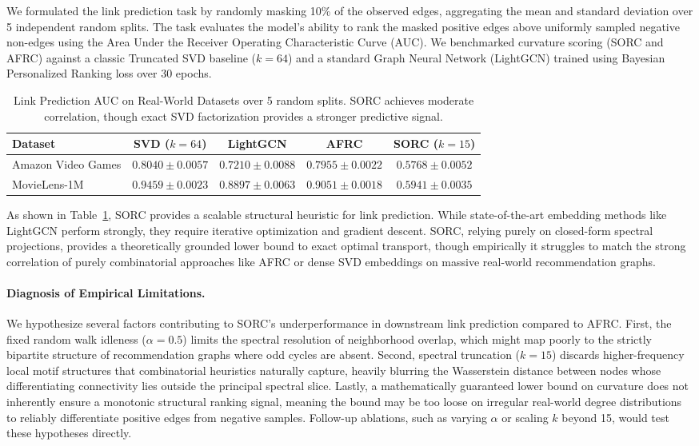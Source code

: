 \documentclass{article}
\begin{document}
We formulated the link prediction task by randomly masking 10\% of the observed edges, aggregating the mean and standard deviation over 5 independent random splits. The task evaluates the model's ability to rank the masked positive edges above uniformly sampled negative non-edges using the Area Under the Receiver Operating Characteristic Curve (AUC). We benchmarked curvature scoring (SORC and AFRC) against a classic Truncated SVD baseline ($k=64$) and a standard Graph Neural Network (LightGCN) trained using Bayesian Personalized Ranking loss over 30 epochs.

\begin{table}[h]
  \caption{Link Prediction AUC on Real-World Datasets over 5 random splits. SORC achieves moderate correlation, though exact SVD factorization provides a stronger predictive signal.}
  \label{tab:link_prediction}
  \centering
  \begin{tabular}{lcccc}
    \toprule
    Dataset & SVD ($k=64$) & LightGCN & AFRC & SORC ($k=15$) \\
    \midrule
    Amazon Video Games & \textbf{$0.8040\pm0.0057$} & $0.7210\pm0.0088$ & $0.7955\pm0.0022$ & $0.5768\pm0.0052$ \\
    MovieLens-1M       & \textbf{$0.9459\pm0.0023$} & $0.8897\pm0.0063$ & $0.9051\pm0.0018$ & $0.5941\pm0.0035$ \\
    \bottomrule
  \end{tabular}
\end{table}

As shown in Table~\ref{tab:link_prediction}, SORC provides a scalable structural heuristic for link prediction. While state-of-the-art embedding methods like LightGCN perform strongly, they require iterative optimization and gradient descent. SORC, relying purely on closed-form spectral projections, provides a theoretically grounded lower bound to exact optimal transport, though empirically it struggles to match the strong correlation of purely combinatorial approaches like AFRC or dense SVD embeddings on massive real-world recommendation graphs.

\paragraph{Diagnosis of Empirical Limitations.} We hypothesize several factors contributing to SORC's underperformance in downstream link prediction compared to AFRC. First, the fixed random walk idleness ($\alpha=0.5$) limits the spectral resolution of neighborhood overlap, which might map poorly to the strictly bipartite structure of recommendation graphs where odd cycles are absent. Second, spectral truncation ($k=15$) discards higher-frequency local motif structures that combinatorial heuristics naturally capture, heavily blurring the Wasserstein distance between nodes whose differentiating connectivity lies outside the principal spectral slice. Lastly, a mathematically guaranteed lower bound on curvature does not inherently ensure a monotonic structural ranking signal, meaning the bound may be too loose on irregular real-world degree distributions to reliably differentiate positive edges from negative samples. Follow-up ablations, such as varying $\alpha$ or scaling $k$ beyond 15, would test these hypotheses directly.
\end{document}
